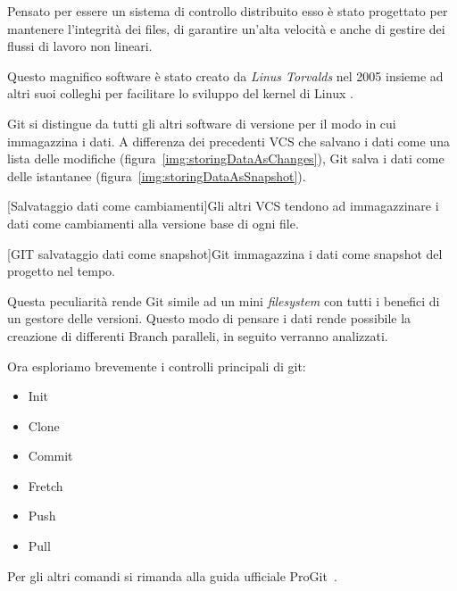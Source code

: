 			Pensato per essere un sistema di controllo distribuito esso è stato progettato per mantenere l'integrità dei files, di garantire un'alta velocità e anche di gestire dei flussi di lavoro non lineari.
			
			Questo magnifico software è stato creato da \textit{Linus Torvalds} nel 2005 insieme ad altri suoi colleghi per facilitare lo sviluppo del kernel di Linux .
			
			Git si distingue da tutti gli altri software di versione per il modo in cui immagazzina i dati. A differenza dei precedenti VCS che salvano i dati come una lista delle modifiche (figura~\ref{img:storingDataAsChanges}), Git salva i dati come delle istantanee (figura~\ref{img:storingDataAsSnapshot}). 
			
			\begin{center}
				[Salvataggio dati come cambiamenti]{Gli altri VCS tendono ad immagazzinare i dati come cambiamenti alla versione base di ogni file.}
				\label{img:storingDataAsChanges}
			\end{center}
		
			\begin{center}
				[GIT salvataggio dati come snapshot]{Git immagazzina i dati come snapshot del progetto nel tempo.}\label{img:storingDataAsSnapshot}
			\end{center}
			
			Questa peculiarità rende Git simile ad un mini \textit{filesystem} con tutti i benefici di un gestore delle versioni.
			Questo modo di pensare i dati rende possibile la creazione di differenti Branch paralleli, in seguito verranno analizzati.
			
			Ora esploriamo brevemente i controlli principali di git:
			\begin{itemize}
				\item Init
				\item Clone
				\item Commit
				\item Fretch
				\item Push
				\item Pull
			\end{itemize}
			Per gli altri comandi si rimanda alla guida ufficiale ProGit~\citep{ProGit2018}.
			
